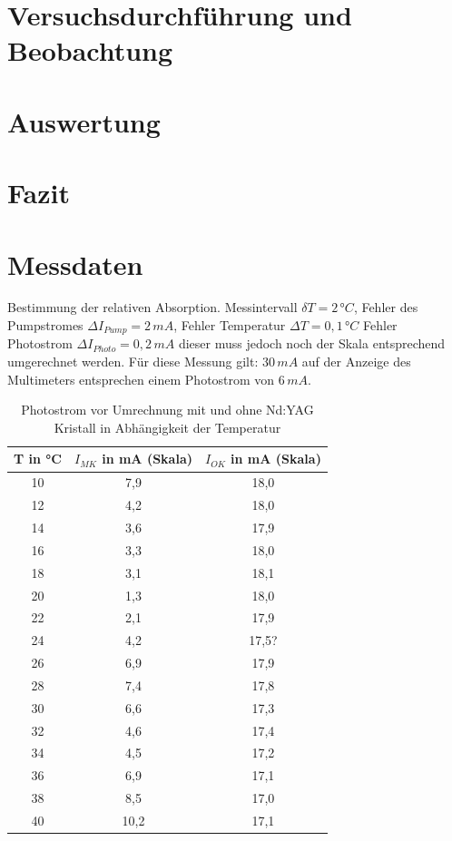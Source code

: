 \documentclass[twoside,colorback,accentcolor=tud4c,11pt]{tudreport}
\begin{document}
\chapter{Versuchsdurchführung und Beobachtung}
  
     	
\chapter{Auswertung}
\chapter{Fazit}
\chapter{Messdaten}
Bestimmung der relativen Absorption. Messintervall $\delta T=2\,\si{°C}$, Fehler des Pumpstromes $\Delta I_{Pump}=2\,\si{mA}$, Fehler Temperatur $\Delta T=0,1\,\si{°C}$ Fehler Photostrom $\Delta I_{Photo}=0,2\,\si{mA}$ dieser muss jedoch noch der Skala entsprechend umgerechnet werden. Für diese Messung gilt: $30\,\si{mA}$ auf der Anzeige des Multimeters entsprechen einem Photostrom von $6\,\si{mA}$.
\begin{table}[H]
\renewcommand*{\arraystretch}{1.2}
\centering
\begin{tabular}{|c|c|c|}
\hline 
T in °C & $I_{MK}$ in mA (Skala) & $I_{OK}$ in mA (Skala)\\
\hline 
10 & 7,9 & 18,0 \\ 
\hline 
12 & 4,2 & 18,0 \\ 
\hline 
14 & 3,6 & 17,9 \\ 
\hline 
16 & 3,3 & 18,0 \\ 
\hline 
18 & 3,1 & 18,1 \\ 
\hline
20 & 1,3 & 18,0 \\ 
\hline
22 & 2,1 & 17,9 \\ 
\hline
24 & 4,2 & 17,5? \\ 
\hline
26 & 6,9 & 17,9 \\ 
\hline
28 & 7,4 & 17,8 \\ 
\hline
30 & 6,6 & 17,3 \\ 
\hline
32 & 4,6 & 17,4 \\ 
\hline
34 & 4,5 & 17,2 \\ 
\hline
36 & 6,9 & 17,1 \\ 
\hline
38 & 8,5 & 17,0 \\ 
\hline
40 & 10,2 & 17,1 \\ 
\hline
\end{tabular} 
\caption{Photostrom vor Umrechnung mit und ohne Nd:YAG Kristall in Abhängigkeit der Temperatur}\label{relabs}
\end{table}
\end{document}
